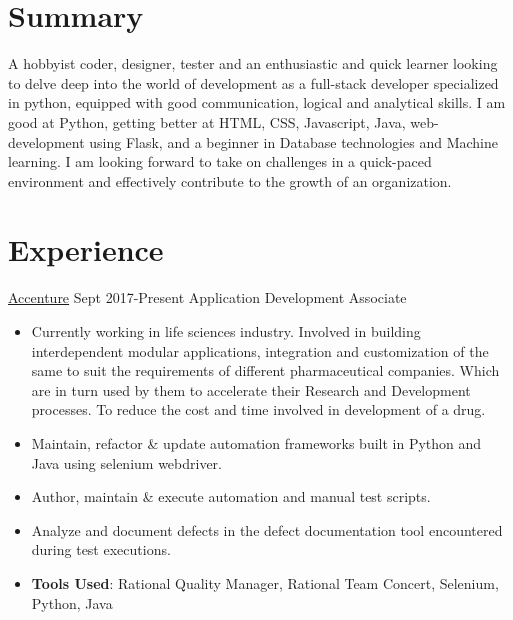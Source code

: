 \documentclass[a4paper,14pt]{twentysecondcv} %
\begin{document}
\makeprofile %

\section{Summary}
\vspace{4px}
\large
\begin{spacing}{1.2}
A hobbyist coder, designer, tester and an enthusiastic and quick learner looking to delve deep into the world of development as a full-stack developer specialized in python, equipped with good communication, logical and analytical skills. I am good at Python, getting better at HTML, CSS, Javascript, Java, web-development using Flask, and a beginner in Database technologies and Machine learning. I am looking forward to take on challenges in a quick-paced environment and effectively contribute to the growth of an organization.
\end{spacing}
\section{Experience}
\vspace{4px}

\begin{twenty} %
\twentyitem
    	{\href{https://www.accenture.com/in-en}{Accenture}}
		{Sept 2017-Present}
        {Application Development Associate}
        {}
        {}
        {
        \begin{spacing}{1.2}                
        \begin{itemize}
        \item Currently working in life sciences industry. Involved in building interdependent modular applications, integration and customization of the same to suit the requirements of different pharmaceutical companies. Which are in turn used by them to accelerate their Research and Development processes. To reduce the cost and time involved in development of a drug.
        \item Maintain, refactor \& update automation frameworks built in Python and Java using selenium webdriver.
        \item Author, maintain \& execute automation and manual test scripts.
        \item Analyze and document defects in the defect documentation tool encountered during test executions.
        \item \textbf{Tools Used}: Rational Quality Manager, Rational Team Concert, Selenium, Python, Java
        \end{itemize}
        \end{spacing}}
        \\
        
\end{twenty}
\end{document}

